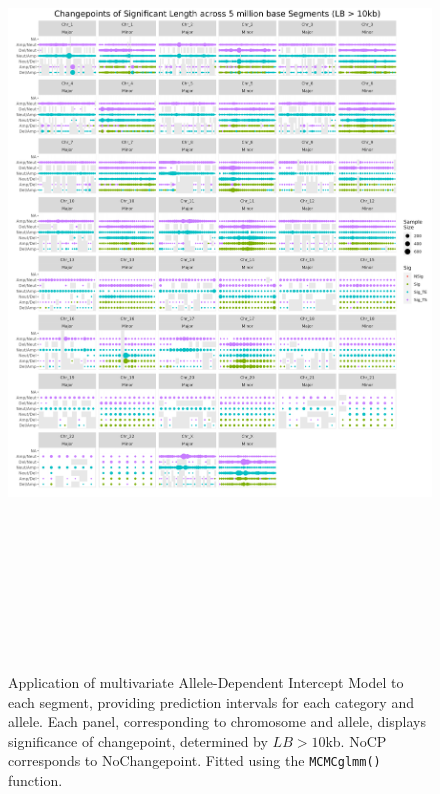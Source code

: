 \begin{figure}[!hp]
\centering
\includegraphics[width = 1\textwidth, height = 22cm]{../figures/Chapter_6/PerSegments_MCMC_10kb_fivemillion_Thesis.png}
\caption[Application of multivariate Allele-Dependent Intercept Model to each segment, providing prediction intervals for each category and allele. Significance determined by $LB > 10$kb.]{Application of multivariate Allele-Dependent Intercept Model to each segment, providing prediction intervals for each category and allele. Each panel, corresponding to chromosome and allele, displays significance of changepoint, determined by $LB > 10$kb. NoCP corresponds to NoChangepoint. Fitted using the \texttt{MCMCglmm()} function.}
\label{fig:PerSegment_MCMC}
\end{figure}
